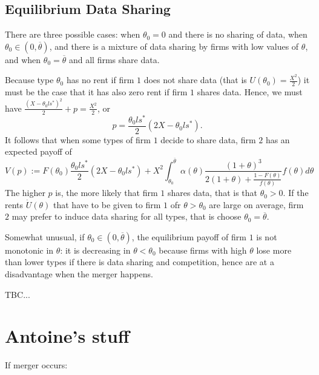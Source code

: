 \documentclass[a4paper]{article}
\renewcommand{\t}{\theta}
\renewcommand{\a}{\alpha}
\begin{document}
\subsection*{Equilibrium Data Sharing}
There are three possible cases: when $\t_0=0$ and there is no sharing of data, when $\t_0\in(0,\overline \t)$, and there is a mixture of data sharing by firms with low values of $\t$, and when $\t_0=\overline \t$ and all firms share data.

Because type $\t_0$ has no rent if firm $1$ does not share data (that is $U(\t_0)=\frac{X^2}{2}$) it must be the case that it has also zero rent if firm $1$ shares data. Hence, we must have $\frac{(X-\t_0 l s^*)^2}{2}+p=\frac{X^2}{2}$, or
%
\[
p=\frac{\t_0 l s^*}{2}(2X-\t_0 l s^*).
\]
%
It follows that when some types of firm $1$ decide to share data, firm $2$ has an expected payoff of 
%
\[
V(p):=F(\t_0)\frac{\t_0 l s^*}{2}(2X-\t_0 l s^*)+X^2\int_{\t_0}^{\overline \t}\a(\t) \frac{(1+\t)^3}{2(1+\t)+\frac{1-F(\t)}{f(\t)}}f(\t)d\t
\]
%
The  higher $p$ is, the more likely that firm $1$ shares data, that is that $\t_0>0$. If the rents $\dot U(\t)$ that have to be given to firm $1$ ofr $\t>\t_0$ are large on average, firm $2$ may prefer to induce data sharing for all types, that is choose $\t_0=\overline \t$.

Somewhat unusual, if $\t_0\in(0,\overline \t)$, the equilibrium payoff of firm $1$ is not monotonic in $\t$: it is decreasing in $\t<\t_0$ because firms with high $\t$ lose more than lower types if there is data sharing and competition, hence are at a disadvantage when the merger happens.


TBC...


\section{Antoine's stuff}

If merger occurs:
\end{document}
